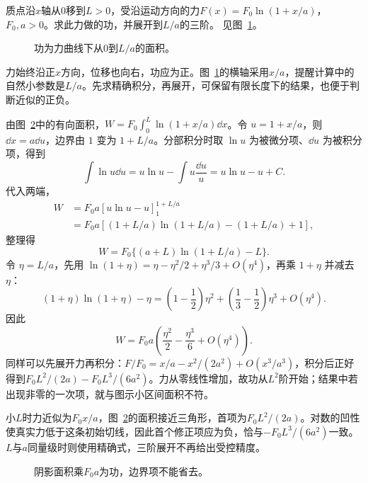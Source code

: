 \begin{exercise}[对数力的功]\label{ex:c1-h4}
质点沿$x$轴从$0$移到$L>0$，受沿运动方向的力$F(x)=F_0\ln(1+x/a)$，$F_0,a>0$。求此力做的功，并展开到$L/a$的三阶。 见图~\ref{fig:c1-h4-q}。
\end{exercise}

\begin{figure}[H]\centering
{}
\caption{功为力曲线下从$0$到$L/a$的面积。}\label{fig:c1-h4-q}
\end{figure}
\begin{solution}
力始终沿正$x$方向，位移也向右，功应为正。图~\ref{fig:c1-h4-q}的横轴采用$x/a$，提醒计算中的自然小参数是$L/a$。先求精确积分，再展开，可保留有限长度下的结果，也便于判断近似的正负。


由图~\ref{fig:c1-h4-s}中的有向面积，$W=F_0\int_0^L\ln(1+x/a)\dd x$。令 $u=1+x/a$，则 $\dd x=a\dd u$，边界由 $1$ 变为 $1+L/a$。分部积分时取 $\ln u$ 为被微分项、$\dd u$ 为被积分项，得到
\[
\int\ln u\dd u=u\ln u-\int u\frac{\dd u}{u}=u\ln u-u+C.
\]
代入两端，
\[
\begin{aligned}
W&=F_0a[u\ln u-u]_1^{1+L/a}\\
&=F_0a\left[(1+L/a)\ln(1+L/a)-(1+L/a)+1\right],
\end{aligned}
\]
整理得
\[\boxed{W=F_0\{(a+L)\ln(1+L/a)-L\}}.
\]
令 $\eta=L/a$，先用 $\ln(1+\eta)=\eta-\eta^2/2+\eta^3/3+O(\eta^4)$，再乘 $1+\eta$ 并减去 $\eta$：
\[
(1+\eta)\ln(1+\eta)-\eta
=\left(1-\frac12\right)\eta^2+\left(\frac13-\frac12\right)\eta^3+O(\eta^4).
\]
因此
\[W=F_0a\left(\frac{\eta^2}{2}-\frac{\eta^3}{6}+O(\eta^4)\right).
\]
同样可以先展开力再积分：$F/F_0=x/a-x^2/(2a^2)+O(x^3/a^3)$，积分后正好得到$F_0L^2/(2a)-F_0L^3/(6a^2)$。力从零线性增加，故功从$L^2$阶开始；结果中若出现非零的一次项，就与图示小区间面积不符。


小$L$时力近似为$F_0x/a$，图~\ref{fig:c1-h4-s}的面积接近三角形，首项为$F_0L^2/(2a)$。对数的凹性使真实力低于这条初始切线，因此首个修正项应为负，恰与$-F_0L^3/(6a^2)$一致。$L$与$a$同量级时则使用精确式，三阶展开不再给出受控精度。

\begin{figure}[H]\centering
{}
\caption{阴影面积乘$F_0a$为功，边界项不能省去。}\label{fig:c1-h4-s}
\end{figure}
\end{solution}

